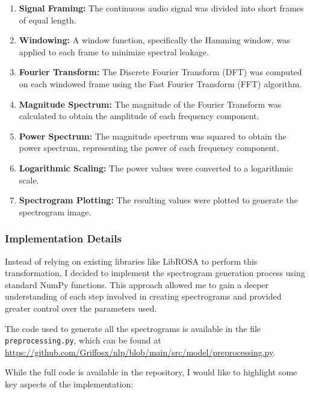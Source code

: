\documentclass[12pt]{article}
\begin{document}
\begin{enumerate}
\item \textbf{Signal Framing:} The continuous audio signal was divided into short frames of equal length.
\item \textbf{Windowing:} A window function, specifically the Hamming window, was applied to each frame to minimize spectral leakage.
\item \textbf{Fourier Transform:} The Discrete Fourier Transform (DFT) was computed on each windowed frame using the Fast Fourier Transform (FFT) algorithm.
\item \textbf{Magnitude Spectrum:} The magnitude of the Fourier Transform was calculated to obtain the amplitude of each frequency component.
\item \textbf{Power Spectrum:} The magnitude spectrum was squared to obtain the power spectrum, representing the power of each frequency component.
\item \textbf{Logarithmic Scaling:} The power values were converted to a logarithmic scale.
\item \textbf{Spectrogram Plotting:} The resulting values were plotted to generate the spectrogram image.
\end{enumerate}

\subsubsection{Implementation Details}

Instead of relying on existing libraries like LibROSA to perform this transformation, I decided to implement the spectrogram generation process using standard NumPy functions. This approach allowed me to gain a deeper understanding of each step involved in creating spectrograms and provided greater control over the parameters used.

The code used to generate all the spectrograms is available in the file \texttt{preprocessing.py}, which can be found at \href{https://github.com/Griffosx/nlp/blob/main/src/model/preprocessing.py}{https://github.com/Griffosx/nlp/blob/main/src/model/preprocessing.py}.

While the full code is available in the repository, I would like to highlight some key aspects of the implementation:
\end{document}
